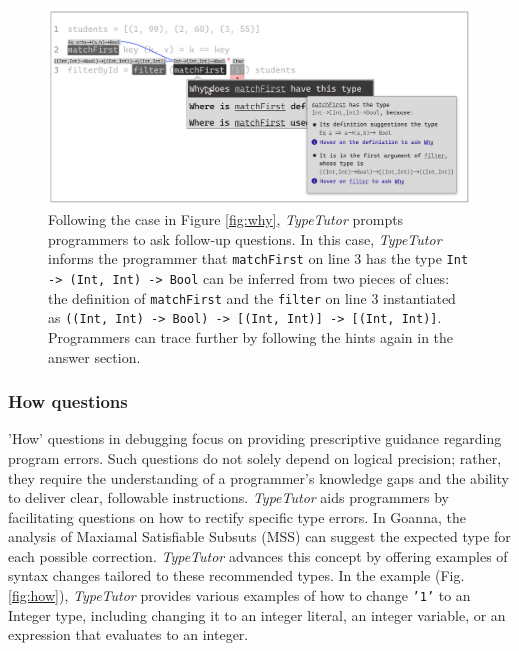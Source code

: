 \begin{figure}[hbt]
  \includegraphics[width=\linewidth]{FollowUp}
  \caption{
    \label{fig:follow-up}
     Following the case in Figure \ref{fig:why}, \textit{TypeTutor} prompts programmers to ask follow-up questions. In this case, \textit{TypeTutor} informs the programmer that \texttt{matchFirst} on line 3 has the type \texttt{Int -> (Int, Int) -> Bool} can be inferred from two pieces of clues:  the definition of \texttt{matchFirst} and the \texttt{filter} on line 3 instantiated as \texttt{((Int, Int) -> Bool) -> [(Int, Int)] -> [(Int, Int)]}. Programmers can trace further by following the hints again in the answer section.
    }
\end{figure}

\subsubsection{How questions}

'How' questions in debugging focus on providing prescriptive guidance regarding program errors. Such questions do not solely depend on logical precision; rather, they require the understanding of a programmer's knowledge gaps and the ability to deliver clear, followable instructions. \textit{TypeTutor} aids programmers by facilitating questions on how to rectify specific type errors. In Goanna, the analysis of Maxiamal Satisfiable Subsuts (MSS) can suggest the expected type for each possible correction. \textit{TypeTutor} advances this concept by offering examples of syntax changes tailored to these recommended types. In the example (Fig. \ref{fig:how}), \textit{TypeTutor} provides various examples of how to change \texttt{'1'} to an Integer type, including changing it to an integer literal, an integer variable, or an expression that evaluates to an integer. 



